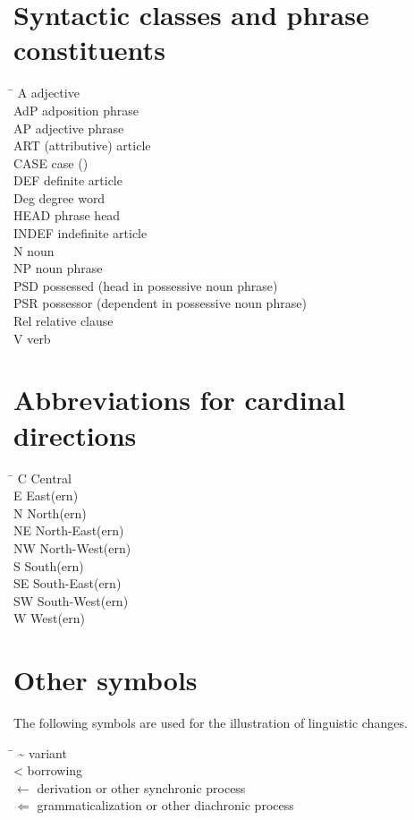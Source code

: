 \section{Syntactic classes and phrase constituents}
\begin{tabbing}
\TABh \= \kill
{A} \> adjective\\
{AdP} \> adposition phrase\\
{AP} \> adjective phrase\\
{ART} \> (attributive) article\\
{CASE} \> case ()\\
{DEF} \> definite article\\
{Deg} \> degree word\\
{HEAD} \> phrase head\\
{INDEF} \> indefinite article\\
{N} \> noun\\
{NP} \> noun phrase\\
{PSD} \> possessed (head in possessive noun phrase)\\ 
{PSR} \> possessor (dependent in possessive noun phrase)\\
{Rel} \> relative clause\\
{V} \> verb
\end{tabbing}

\section{Abbreviations for cardinal directions}
\begin{multicols}{2}
\begin{tabbing}
\TABh \= \kill
{C} \> Central\\
{E} \> East(ern)\\
{N} \> North(ern)\\
{NE} \> North-East(ern)\\
{NW} \> North-West(ern)\\
{S} \> South(ern)\\
{SE} \> South-East(ern)\\
{SW} \> South-West(ern)\\
{W} \> West(ern)
\end{tabbing}
\end{multicols}

\section{Other symbols}
The following symbols are used for the illustration of linguistic changes.
\begin{tabbing}
\TABh \= \kill
\textasciitilde \> variant\\
<  \> borrowing\\
$\leftarrow$  \> derivation or other synchronic process\\
$\Leftarrow$  \> grammaticalization or other diachronic process\footnotemark
\end{tabbing}

